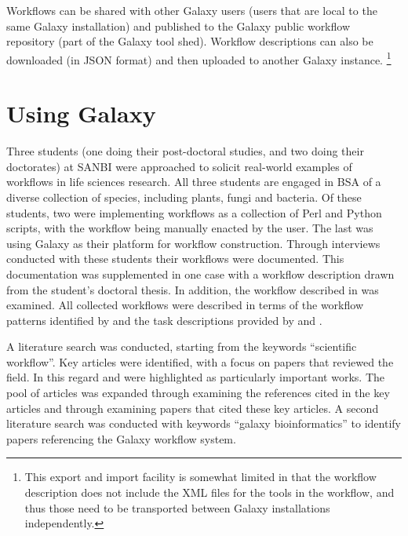 \documentclass[a4paper,10pt]{scrreprt}
\begin{document}
Workflows can be shared with other Galaxy users (users that are local to the same Galaxy installation) and published to the Galaxy public workflow repository (part of the Galaxy tool shed). Workflow descriptions can also be downloaded (in JSON format) and then uploaded to another Galaxy instance. \footnote{This export and import facility is somewhat limited in that the workflow description does not include the XML files for the tools in the workflow, and thus those need to be transported between Galaxy installations independently.}



\section{Using Galaxy}
Three students (one doing their post-doctoral studies, and two doing their doctorates) at SANBI were approached to solicit real-world examples of workflows in life sciences research. All three students are engaged in \gls{BSA} of a diverse collection of species, including plants, fungi and bacteria. Of these students, two were implementing workflows as a collection of Perl and Python scripts, with the workflow being manually enacted by the user. The last was using Galaxy as their platform for workflow construction. Through interviews conducted with these students their workflows were documented. This documentation was supplemented in one case with a workflow description drawn from the student's doctoral thesis. In addition, the workflow described in \cite{blankenberg_framework_2007} was examined. All collected workflows were described in terms of the workflow patterns identified by \cite{van_der_aalst_workflow_2003} and the task descriptions provided by \cite{stevens_classification_2001}
and \cite{castro_workflows_2005}.

A literature search was conducted, starting from the keywords ``scientific workflow''. Key articles were identified, with a focus on papers that reviewed the field. In this regard \cite{yu_taxonomy_2005} and \cite{deelman_workflows_2009} were highlighted as particularly important works. The pool of articles was expanded through examining the references cited in the key articles and through examining papers that cited these key articles. A second literature search was conducted with keywords ``galaxy bioinformatics'' to identify papers referencing the Galaxy workflow system.
\end{document}
